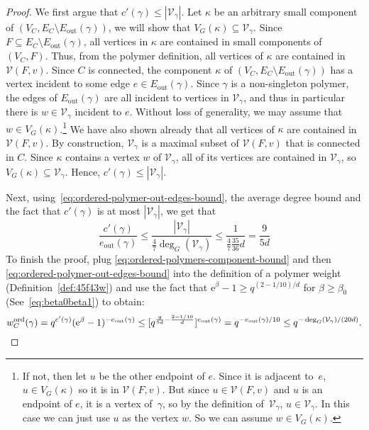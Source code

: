 \documentclass[11pt]{article}
\theoremstyle{plain}
\newcommand{\emm}{\mathrm{e}}
\newcommand{\V}{\mathcal{V}}
\newcommand{\Vin}{\V_\gamma}
\newcommand{\out}{\mathrm{out}}
\newcommand{\1}{\mathbb{1}}
\newcommand{\ord}{\mathrm{ord}}
\begin{document}
\begin{proof}
We first argue that $c'(\gamma) \leq |\Vin|$. Let $\kappa$ be an arbitrary small component of 
\((V_C,E_C\setminus E_\out(\gamma))\), we will show that $V_G(\kappa) \subseteq \Vin$.
Since 
$F \subseteq E_C \setminus E_\out(\gamma)$, 
all vertices in $\kappa$ are contained in small components of $(V_C,F)$.
Thus, from the polymer definition, all vertices of $\kappa$ are contained in   $\V(F,v)$. Since $C$ is connected, the 
component $\kappa$ of $(V_C,E_C \setminus E_\out(\gamma))$ has a vertex incident to some  edge $e\in E_\out(\gamma)$. 
Since $\gamma$ is a non-singleton polymer,   
the edges of $E_\out(\gamma)$ are all incident to vertices in $\Vin$, and thus in particular there is \(w\in\Vin\) incident to $e$. Without loss of generality, we may assume that $w\in V_G(\kappa)$.\footnote{If not, then  let $u$ be the other endpoint of $e$. 
Since it is adjacent to~$e$, 
$u\in V_G(\kappa)$ so it is in $\V(F,v)$. 
But since \(u\in\V(F,v)\) and \(u\) is 
an endpoint of $e$, it is a vertex of~$\gamma$,  so  
by the definition of~$\Vin$, \(u\in\Vin\). In this case we can just use $u$ as the vertex $w$. So we can assume $w \in V_G(\kappa)$.} 
We have also shown already that all vertices of $\kappa$ are contained in $\V(F,v)$. By construction, $\Vin$ is a maximal subset of $\V(F,v)$ that is connected in $C$.
Since $\kappa$ contains a vertex $w$ of $\Vin$, all of its vertices are contained in $\Vin$, so $V_G(\kappa) \subseteq \Vin$. Hence, $c'(\gamma) \leq |\Vin|$.

  

    

Next, using~\eqref{eq:ordered-polymer-out-edges-bound}, the average degree bound and the fact that \(c'(\gamma)\) is at most \(|\V_\gamma|\), we get that
    \begin{equation}\label{eq:ordered-polymers-component-bound}
        \frac{c'(\gamma)}{e_\out(\gamma)} \leq \frac{|\V_\gamma|}{\frac{4}{7}\deg_G(\V_\gamma)} \leq \frac{1}{\frac{4}{7}\frac{35}{36}d} =
        \frac{9}{5d}
    \end{equation}
To finish the proof, plug  
\eqref{eq:ordered-polymers-component-bound} and
then \eqref{eq:ordered-polymer-out-edges-bound}
into the definition of a polymer weight (Definition~\ref{def:45f43w}) and use the fact that \(\emm^\beta -1 \geq q^{(2-1/10)/d}\) for $\beta\geq \beta_0$ (See~\eqref{eq:beta0beta1}) to obtain:
    \[
w^\ord_C(\gamma) =  q^{c'(\gamma)} (\emm^\beta - 1)^{-e_\out(\gamma)}
\leq
[q^{\frac{9}{5d} - \frac{2-1/10}{d}}]^{e_\out(\gamma)} = q^{-e_\out(\gamma)/10}\leq q^{-\deg_G(\V_\gamma)/(20d)}.\qedhere
    \]
\end{proof}
\end{document}
